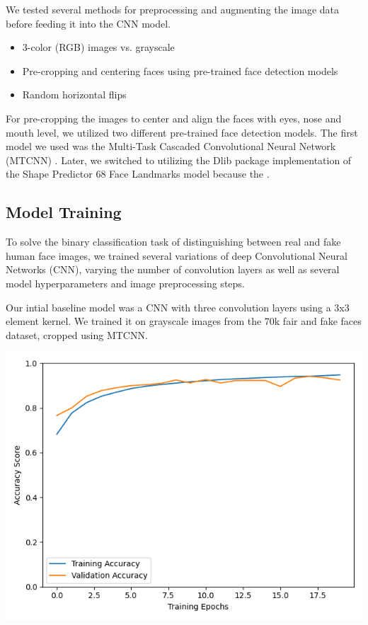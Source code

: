 \documentclass[11pt, letterpaper]{article}
\newenvironment{Figure}
  {\par\medskip\noindent\minipage{\linewidth}}
  {\endminipage\par\medskip}
\providecommand{\tightlist}{%
  \setlength{\itemsep}{0pt}\setlength{\parskip}{0pt}
}
\begin{document}
\begin{multicols}{2}
  We tested several methods for preprocessing and augmenting the image data
  before feeding it into the CNN model.

  \begin{itemize}
    \tightlist
  \item 3-color (RGB) images vs. grayscale
  \item Pre-cropping and centering faces using pre-trained face
    detection models
  \item Random horizontal flips
  \end{itemize}

  For pre-cropping the images to center and align the faces with eyes,
  nose and mouth level, we utilized two different pre-trained face
  detection models. The first model we used was the Multi-Task
  Cascaded Convolutional Neural Network (MTCNN)
  \cite{Zhang_2016}. Later, we switched to utilizing the Dlib package
  implementation of the Shape Predictor 68 Face Landmarks model
  \cite{SAGONAS20163} because the .

  \subsection{Model Training}

  To solve the binary classification task of distinguishing between
  real and fake human face images, we trained several variations of
  deep Convolutional Neural Networks (CNN), varying the number of
  convolution layers as well as several model hyperparameters and
  image preprocessing steps.

  Our intial baseline model was a CNN with three convolution layers
  using a 3x3 element kernel. We trained it on grayscale images from
  the 70k fair and fake faces dataset, cropped using MTCNN.

  \begin{Figure}
    \centering
    \includegraphics[width=1.0\textwidth]{figures/learning-curve-baseline-cropped-grayscale-noaug.png}
    \label{learning-curve-baseline}
  \end{Figure}


\end{multicols}
\end{document}
